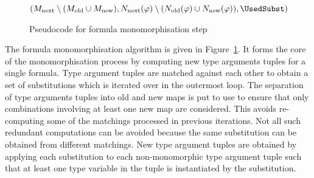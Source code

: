 \documentclass[runningheads]{llncs}
\begin{document}
\begin{figure}[t]
\begin{algorithm}[H]
{   

   \BlankLine

   \Return \((M_{\text{next}}\setminus (M_{\text{old}} \cup M_{\text{new}}), N_{\text{next}}(\varphi)\setminus (N_{\text{old}}(\varphi)\cup N_{\text{new}}(\varphi)), \UsedSubst)\)
}

\end{algorithm}
\caption{Pseudocode for formula monomorphisation step}
\label{mono_step}
\end{figure}


The formula monomorphisation algorithm is given in Figure~\ref{mono_step}. It forms the core of the monomorphisation process by computing new type arguments tuples for a single formula. Type argument tuples are matched against each other to obtain a set of substitutions which is iterated over in the outermost loop. 
The separation of type arguments tuples into old and new maps is put to use to ensure that only combinations involving at least one new map are considered. This avoids re-computing some of the matchings processed in previous iterations. Not all such redundant computations can be avoided because the same substitution can be obtained from different matchings. New type argument tuples are obtained by applying each substitution to each non-monomorphic type argument tuple such that at least one type variable in the tuple is instantiated by the substitution.
\end{document}
